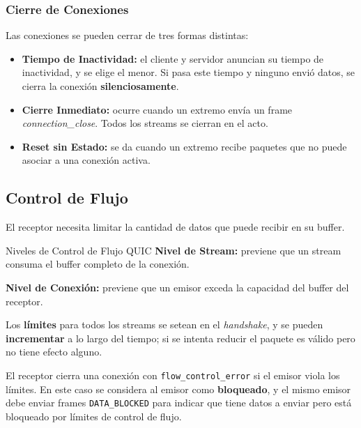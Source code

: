 \subsubsection{Cierre de Conexiones}

Las conexiones se pueden cerrar de tres formas distintas:

\begin{itemize}[label=\textcolor{acento}{$\bullet$}]
    \item \textbf{Tiempo de Inactividad:} el cliente y servidor anuncian su tiempo de inactividad, y se elige el menor. Si pasa este tiempo y ninguno envió datos, se cierra la conexión \textbf{silenciosamente}.
    \item \textbf{Cierre Inmediato:} ocurre cuando un extremo envía un frame \emph{connection\_close}. Todos los streams se cierran en el acto.
    \item \textbf{Reset sin Estado:} se da cuando un extremo recibe paquetes que no puede asociar a una conexión activa.
\end{itemize}

\subsection{Control de Flujo}

El receptor necesita limitar la cantidad de datos que puede recibir en su buffer.

\begin{definicion}{Niveles de Control de Flujo QUIC}
    \textbf{Nivel de Stream:} previene que un stream consuma el buffer completo de la conexión.

    \textbf{Nivel de Conexión:} previene que un emisor exceda la capacidad del buffer del receptor.
\end{definicion}

Los \textbf{límites} para todos los streams se setean en el \emph{handshake}, y se pueden \textbf{incrementar} a lo largo del tiempo; si se intenta reducir el paquete es válido pero no tiene efecto alguno. 

\begin{nota}{}
    El receptor cierra una conexión con \texttt{flow\_control\_error} si el emisor viola los límites. En este caso se considera al emisor como \textbf{bloqueado}, y el mismo emisor debe enviar frames \texttt{DATA\_BLOCKED} para indicar que tiene datos a enviar pero está bloqueado por límites de control de flujo. 
\end{nota}

